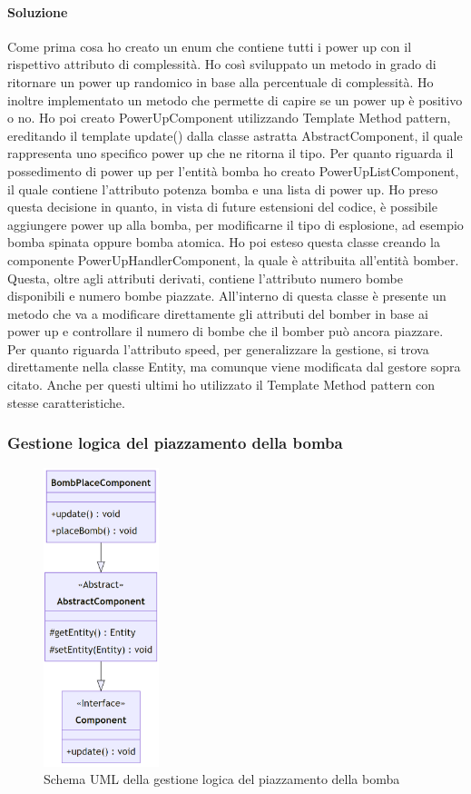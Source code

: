 \documentclass[a4paper,12pt]{report}
\begin{document}
\paragraph{Soluzione} Come prima cosa ho creato un enum che contiene tutti i power up con il rispettivo attributo di complessità. Ho così sviluppato un metodo in grado di ritornare un power up randomico in base alla percentuale di complessità. Ho inoltre implementato un metodo che permette di capire se un power up è positivo o no.
Ho poi creato PowerUpComponent utilizzando Template Method pattern, ereditando  il template update() dalla classe astratta AbstractComponent, il quale rappresenta uno specifico power up che ne ritorna il tipo.
Per quanto riguarda il possedimento di power up per l’entità bomba ho creato PowerUpListComponent, il quale contiene l’attributo potenza bomba e una lista di power up. Ho preso questa decisione in quanto, in vista di future estensioni del codice, è possibile aggiungere power up alla bomba, per modificarne il tipo di esplosione, ad esempio bomba spinata oppure bomba atomica.
Ho poi esteso questa classe creando la componente PowerUpHandlerComponent, la quale è attribuita all’entità bomber. Questa, oltre agli attributi derivati, contiene l’attributo numero bombe disponibili e numero bombe piazzate. All’interno di questa classe è presente un metodo che va a modificare direttamente gli attributi del bomber in base ai power up e controllare il numero di bombe che il bomber può ancora piazzare.
Per quanto riguarda l’attributo speed, per generalizzare la gestione, si trova direttamente nella classe Entity, ma comunque viene modificata dal gestore sopra citato. Anche per questi ultimi ho utilizzato il Template Method pattern con stesse caratteristiche.


\subsubsection{Gestione logica del piazzamento della bomba}

\begin{figure}[H]
    \centering{}
    \includegraphics[width=0.3\textwidth]{img/UMLPlaceBomb.png}
    \caption{Schema UML della gestione logica del piazzamento della bomba}
\end{figure}
\end{document}
